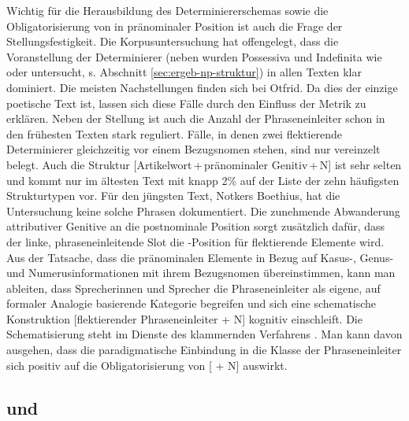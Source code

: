 Wichtig für die Herausbildung des Determiniererschemas sowie die Obligatorisierung von  in pränominaler Position ist auch die Frage der Stellungsfestigkeit. Die Korpusuntersuchung hat offengelegt, dass die Voranstellung der Determinierer (neben  wurden Possessiva und Indefinita wie  oder  untersucht, s. Abschnitt \ref{sec:ergeb-np-struktur}) in allen Texten klar dominiert. Die meisten Nachstellungen finden sich bei Otfrid. Da dies der einzige poetische Text ist, lassen sich diese Fälle durch den Einfluss der Metrik zu erklären. Neben der Stellung ist auch die Anzahl der Phraseneinleiter schon in den frühesten Texten stark reguliert. Fälle, in denen zwei flektierende Determinierer gleichzeitig vor einem Bezugsnomen stehen, sind nur vereinzelt belegt. Auch die Struktur [Artikelwort\,+\,pränominaler Genitiv\,+\,N] ist sehr selten und kommt nur im ältesten Text mit knapp 2\% auf der Liste der zehn häufigsten Strukturtypen vor. Für den jüngsten Text, Notkers Boethius, hat die Untersuchung keine solche Phrasen dokumentiert. Die zunehmende Abwanderung attributiver Genitive an die postnominale Position sorgt zusätzlich dafür, dass der linke, phraseneinleitende Slot die -Position für flektierende Elemente wird. Aus der Tatsache, dass die pränominalen Elemente in Bezug auf Kasus-, Genus- und Numerusinformationen mit ihrem Bezugsnomen übereinstimmen, kann man ableiten, dass Sprecherinnen und Sprecher die Phraseneinleiter als eigene, auf formaler Analogie basierende Kategorie begreifen und sich eine schematische Konstruktion [flektierender Phraseneinleiter + N] kognitiv einschleift. Die Schematisierung steht im Dienste des klammernden Verfahrens \parencite{Ronneberger-Sibold1994,Ronneberger-Sibold2010a,Szczepaniak2010,Szczepaniak2011a,Flick2018}. Man kann davon ausgehen, dass die paradigmatische Einbindung in die Klasse der Phraseneinleiter sich positiv auf die Obligatorisierung von [ + N] auswirkt.     


\subsection{ und } \label{sec:disk-weg-block}

